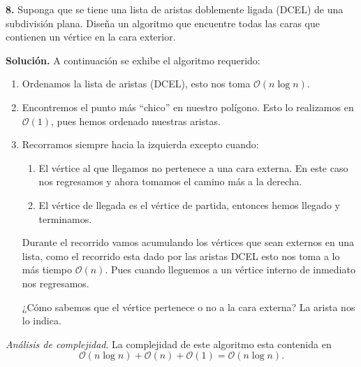 \textbf{8.} Suponga que se tiene una lista de aristas doblemente ligada (DCEL) de una subdivisión
plana. Diseña un algoritmo que encuentre todas las caras que contienen un vértice en la cara exterior.
\newline

\textbf{Solución.} A continuación se exhibe el algoritmo requerido:
\begin{enumerate}
\item Ordenamos la lista de aristas (DCEL), esto nos toma $\mathcal{O}(n \log n)$.
\item Encontremos el punto más ``chico'' en nuestro polígono. Esto lo realizamos en $\mathcal{O}(1)$,
  pues hemos ordenado nuestras aristas.
\item Recorramos siempre hacia la izquierda excepto cuando:
  \begin{enumerate}
  \item El vértice al que llegamos no pertenece a una cara externa. En este caso nos regresamos
    y ahora tomamos el camino más a la derecha.
  \item El vértice de llegada es el vértice de partida, entonces hemos llegado y terminamos.
  \end{enumerate}
  Durante el recorrido vamos acumulando los vértices que sean externos en una lista, como el recorrido
  esta dado por las aristas DCEL esto nos toma a lo más tiempo $\mathcal{O}(n)$. Pues cuando lleguemos a un vértice
  interno de inmediato nos regresamos.
  
  ¿Cómo sabemos que el vértice pertenece o no a la cara externa? La arista nos lo indica.
\end{enumerate}

\textit{Análisis de complejidad}. La complejidad de este algoritmo esta contenida en
\[\mathcal{O}(n \log n) + \mathcal{O}(n) + \mathcal{O}(1) = \mathcal{O}(n \log n).\]

